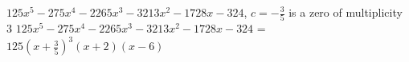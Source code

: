 {$125x^{5} - 275x^{4} - 2265x^{3} - 3213x^{2} - 1728x - 324$, $c = -\frac{3}{5}$ is a zero of multiplicity 3}
{$125x^{5} - 275x^{4} - 2265x^{3} - 3213x^{2} - 1728x - 324$ = $125\left(x + \frac{3}{5} \right)^{3}(x + 2)(x - 6)$}